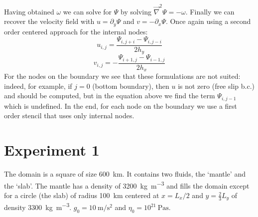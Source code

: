 Having obtained $\omega$ we can solve for $\Psi$ by solving
$\vec\nabla^2 \Psi = -\omega$.
Finally we can recover the velocity field with $u=\partial_y \Psi$ and $v=-\partial_x \Psi$.
Once again using a second order centered approach for the internal nodes:
\[
u_{i,j} = \frac{\Psi_{i,j+i}-\Psi_{i,j-i}}{2 h_y}
\]
\[
v_{i,j} = - \frac{\Psi_{i+1,j}-\Psi_{i-1,j}}{2 h_x}
\]
For the nodes on the boundary we see that these formulations are not suited:
indeed, for example, if $j=0$ (bottom boundary), then $u$ is not zero (free slip b.c.)
and should be computed, but in the equation above we find the term $\Psi_{i,j-1}$ 
which is undefined. In the end, 
for each node on the boundary we use a first order stencil that uses only 
internal nodes.

\section*{Experiment 1}

The domain is a square of size 600~\si{\km}.  
It contains two fluids, the `mantle'  and the `slab'. 
The mantle has a density of 3200~\si{\kg\per\cubic\meter} 
and fills the domain except for a circle (the slab) of radius 100~\si{\km} 
centered at $x=L_x/2$ and $y=\frac23 L_y$  of density 
3300~\si{\kg\per\cubic\meter}. $g_0=10~\si{\meter\per\square\second}$ 
and $\eta_0=10^{21}~\si{\pascal\second}$.

